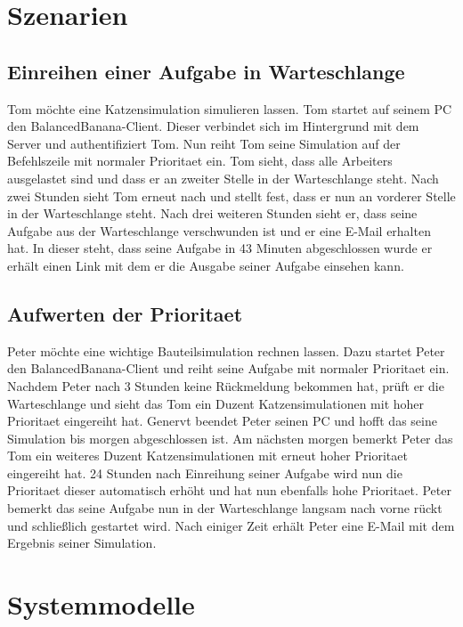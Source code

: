 \documentclass[a4paper,12pt]{article}
\begin{document}
\clearpage
\section{Szenarien}

\subsection{Einreihen einer \gls{Aufgabe} in \gls{Warteschlange}}
Tom möchte eine Katzensimulation simulieren lassen.
Tom startet auf seinem PC den BalancedBanana-\gls{Client}. Dieser verbindet sich im Hintergrund mit dem \gls{Server} und authentifiziert Tom.
Nun reiht Tom seine Simulation auf der \gls{Befehlszeile} mit normaler \gls{Prioritaet} ein.
Tom sieht, dass alle \glspl{Arbeiter} ausgelastet sind und dass er an zweiter Stelle in  der \gls{Warteschlange} steht.
Nach zwei Stunden sieht Tom erneut nach und stellt fest, dass er nun an vorderer Stelle in der \gls{Warteschlange} steht.
Nach drei weiteren Stunden sieht er, dass seine \gls{Aufgabe} aus der \gls{Warteschlange} verschwunden ist und er eine E-Mail erhalten hat.
In dieser steht, dass seine \gls{Aufgabe} in 43 Minuten abgeschlossen wurde er erhält einen Link mit dem er die Ausgabe seiner \gls{Aufgabe} einsehen kann.

\subsection{Aufwerten der \gls{Prioritaet}}
Peter möchte eine wichtige Bauteilsimulation rechnen lassen.
Dazu startet Peter den BalancedBanana-\gls{Client} und reiht seine \gls{Aufgabe} mit normaler \gls{Prioritaet} ein.
Nachdem Peter nach 3 Stunden keine Rückmeldung bekommen hat, prüft er die \gls{Warteschlange} und sieht das Tom ein Duzent Katzensimulationen mit hoher \gls{Prioritaet} eingereiht hat.
Genervt beendet Peter seinen PC und hofft das seine Simulation bis morgen abgeschlossen ist.
Am nächsten morgen bemerkt Peter das Tom ein weiteres Duzent Katzensimulationen mit erneut hoher \gls{Prioritaet} eingereiht hat.
24 Stunden nach Einreihung seiner \gls{Aufgabe} wird nun die \gls{Prioritaet} dieser automatisch erhöht und hat nun ebenfalls hohe \gls{Prioritaet}.
Peter bemerkt das seine \gls{Aufgabe} nun in der \gls{Warteschlange} langsam nach vorne rückt und schließlich gestartet wird. 
Nach einiger Zeit erhält Peter eine E-Mail mit dem Ergebnis seiner Simulation.

\section{Systemmodelle}
\end{document}
